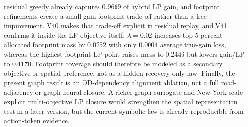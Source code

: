 residual greedy already captures 0.9669 of hybrid LP gain, and footprint refinements create a small gain-footprint trade-off rather than a free improvement. V40 makes that trade-off explicit in residual replay, and V41 confirms it inside the LP objective itself: \(\lambda=0.02\) increases top-5 percent allocated footprint mass by 0.0252 with only 0.0004 average true-gain loss, whereas the highest-footprint LP point raises mass to 0.2446 but lowers gain/LP to 0.4170. Footprint coverage should therefore be modeled as a secondary objective or spatial preference, not as a hidden recovery-only law. Finally, the present graph result is an OD-dependency alignment ablation, not a full road-adjacency or graph-neural closure. A richer graph surrogate and New York-scale explicit multi-objective LP closure would strengthen the spatial representation test in a later version, but the current symbolic law is already reproducible from action-token evidence.
